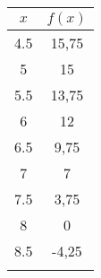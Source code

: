 \documentclass[12pt]{article}
\begin{document}
\begin{exercice}
\begin{enumerate}
\begin{multicols}{2}
\begin{enumerate}
\begin{multicols}{2}
                \begin{tabular}{|c|c|}
                  \hline
                  $x$ & $f(x)$ \\
                  \hline
                  4.5 & 15,75 \\
                  \hline
                  5 & 15 \\
                  \hline
                  5.5 & 13,75 \\
                  \hline
                  6 & 12 \\
                  \hline
                  6.5 & 9,75 \\
                  \hline
                  7 & 7 \\
                  \hline
                  7.5 & 3,75 \\
                  \hline
                  8 & 0 \\
                  \hline
                  8.5 & -4,25 \\
                  \hline
                  &\\
                  \hline
                \end{tabular}
            \end{multicols}
      \end{enumerate}
            \end{multicols}


\end{enumerate}
\end{exercice}
\end{document}
